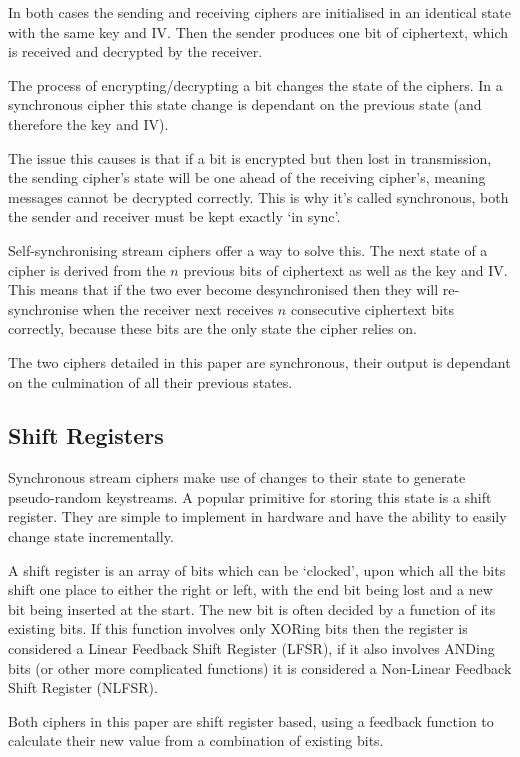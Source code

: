 \documentclass{report}
\let\Oldsubsection\subsection
\renewcommand{\subsection}{\FloatBarrier\Oldsubsection}
\begin{document}
In both cases the sending and receiving ciphers are initialised in an identical state with the same key and IV. Then the sender produces one bit of ciphertext, which is received and decrypted by the receiver.

The process of encrypting/decrypting a bit changes the state of the ciphers. In a synchronous cipher this state change is dependant on the previous state (and therefore the key and IV).

The issue this causes is that if a bit is encrypted but then lost in transmission, the sending cipher's state will be one ahead of the receiving cipher's, meaning messages cannot be decrypted correctly. This is why it's called synchronous, both the sender and receiver must be kept exactly `in sync'.

Self-synchronising stream ciphers offer a way to solve this. The next state of a cipher is derived from the $n$ previous bits of ciphertext as well as the key and IV. This means that if the two ever become desynchronised then they will re-synchronise when the receiver next receives $n$ consecutive ciphertext bits correctly, because these bits are the only state the cipher relies on.

The two ciphers detailed in this paper are synchronous, their output is dependant on the culmination of all their previous states.

\subsection{Shift Registers}
Synchronous stream ciphers make use of changes to their state to generate pseudo-random keystreams. A popular primitive for storing this state is a shift register. They are simple to implement in hardware\cite{shiftregistersHardware} and have the ability to easily change state incrementally.

A shift register is an array of bits which can be `clocked', upon which all the bits shift one place to either the right or left, with the end bit being lost and a new bit being inserted at the start. The new bit is often decided by a function of its existing bits. If this function involves only XORing bits then the register is considered a Linear Feedback Shift Register (LFSR), if it also involves ANDing bits (or other more complicated functions) it is considered a Non-Linear Feedback Shift Register (NLFSR).

Both ciphers in this paper are shift register based, using a feedback function to calculate their new value from a combination of existing bits.
\end{document}
